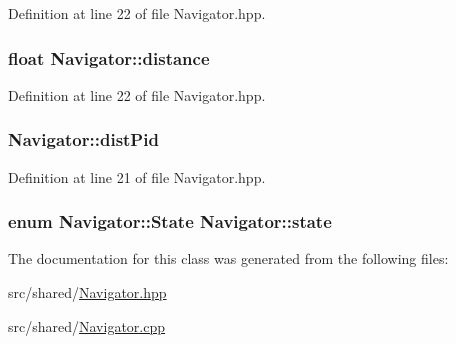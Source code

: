 Definition at line 22 of file Navigator.\-hpp.

\hypertarget{classNavigator_accc10be1bc4dfe67ce799e69869f0caa}{
\subsubsection[{distance}]{\setlength{\rightskip}{0pt plus 5cm}float Navigator\-::distance\hspace{0.3cm}{\ttfamily [private]}}}\label{classNavigator_accc10be1bc4dfe67ce799e69869f0caa}


Definition at line 22 of file Navigator.\-hpp.

\hypertarget{classNavigator_ab6f4e8b5937d700d4514c438cb7b3927}{
\subsubsection[{dist\-Pid}]{ Navigator\-::dist\-Pid\hspace{0.3cm}{\ttfamily [private]}}}\label{classNavigator_ab6f4e8b5937d700d4514c438cb7b3927}


Definition at line 21 of file Navigator.\-hpp.

\hypertarget{classNavigator_a15263fe64d0ea29a1bbfe9e5ef849c4c}{
\subsubsection[{state}]{\setlength{\rightskip}{0pt plus 5cm}enum {\bf Navigator\-::\-State}  Navigator\-::state\hspace{0.3cm}{\ttfamily [private]}}}\label{classNavigator_a15263fe64d0ea29a1bbfe9e5ef849c4c}


The documentation for this class was generated from the following files\-:\begin{DoxyCompactItemize}
\item 
src/shared/\hyperlink{Navigator_8hpp}{Navigator.\-hpp}\item 
src/shared/\hyperlink{Navigator_8cpp}{Navigator.\-cpp}\end{DoxyCompactItemize}
